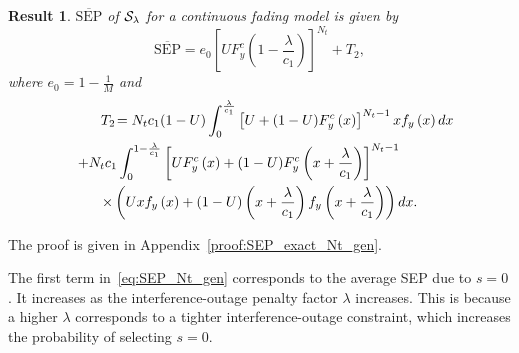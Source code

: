 \documentclass[12pt,draftcls,peerreview,onecolumn]{IEEEtran}
\newtheorem{result}{{\bf Result}}
\newcommand{\SEP}{\text{SEP}}
\newcommand{\nx}{{0}}
\newcommand{\lam}{\lambda}
\newcommand{\termtwo}{T_2}
\newcommand{\Nt}{{N_t}}
\newcommand{\Nr}{{N_r}}
\newcommand{\cone}{c_{1}}
\newcommand{\ctwo}{c_{2}}
\newcommand{\lambym}{\frac{\lam}{\cone}}
\newcommand{\al}{\ctwo}
\newcommand{\snr}{\Omega}
\newcommand{\albysnr}[1][]{\frac{\al#1}{\snr}}
\newcommand{\un}{U}
\newcommand{\zerosep}{e_0}
\newcommand{\callamrule}{{\cal S_{{\lam}}}}
\newcommand{\avgSEP}{\overline{\SEP}}
\newcommand{\unccdfy}[2]{\frac{{#1}\,\,\gamma\left(\Nr,-\albysnr\ln{#2}\right)}{(\Nr-1)!}}
\newcommand{\ytimespdfyNr}{\left(\ln\left(\frac{1}{x}\right)\right)^{\Nr-1}x^{\albysnr[]}} %
\newcommand{\ypluslamtimespdfyNr}{\left(\ln\left(\frac{1}{x+\lambym}\right)\right)^{\Nr-1}\left(x+\lambym\right)^{\albysnr[]}} %
\newcommand{\pdfyNrgen}[1]{f_{y}\left(#1\right)} %
\newcommand{\ccdfy}[1]{F^{c}_{y}\left(#1 \right)}
\newcommand{\unccdfygen}[2]{{#1} \ccdfy{#2}  }
\begin{document}
\begin{result}
\label{thm:SEP_exact_Nt_gen}
$\avgSEP$ of $\callamrule$ for a continuous fading model is given by
\begin{equation}
\label{eq:SEP_Nt_gen} 
\avgSEP= \zerosep\left[\unccdfygen{\un}{1-\lambym}\right]^{\Nt} + \termtwo,
\end{equation}
%
where $\zerosep=1-\frac{1}{M}$ and
\begin{multline}
\hspace{25pt}\termtwo \!= \Nt\cone(1-\un)\int_{0}^{\lambym} \left[\un + \unccdfygen{(1-\un)}{x}\right]^{\Nt-1} x\pdfyNrgen{x} dx\\
\hspace{-30pt}+ \Nt\cone \int_{0}^{1-\lambym}
\left[\unccdfygen{\un}{x} +\unccdfygen{(1-\un)}{x+\lambym}  \right]^{\Nt-1}\\
\times\left(\un x\pdfyNrgen{x} + (1-\un)\left(x + \lambym\right) \pdfyNrgen{x + \lambym}\right) dx.
\label{eq:termtwo_gen}
\end{multline}
%
\end{result}
%
\begin{IEEEproof}
The proof is given in Appendix~\ref{proof:SEP_exact_Nt_gen}.
\end{IEEEproof}
%

The first term in~\eqref{eq:SEP_Nt_gen} corresponds to the average SEP due to $s=\nx$. It increases as the interference-outage penalty factor $\lam$ increases. This is because a higher $\lam$ corresponds to a tighter interference-outage constraint, which increases the probability of selecting $s=\nx$. 
%
\end{document}
